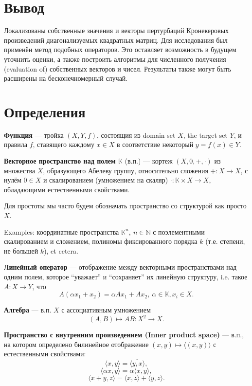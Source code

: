 \documentclass[14pt,a4paper]{extarticle}
\theoremstyle{definition}
\begin{document}
\section{Вывод}

Локализованы собственные значения и векторы пертурбаций Кронекеровых
произведений диагонализуемых квадратных матриц. Для исследования был применён
метод подобных операторов.
Это оставляет возможность в будущем уточнить оценки, а также построить алгоритмы
для численного получения (evaluation of) собственных векторов и чисел.
Результаты также могут быть расширены на бесконечномерный случай.

\newpage
\appendix
\section{Определения}

\textbf{Функция} --- тройка \( (X, Y, f) \), состоящия из domain set \( X \),
the target set \( Y \), и правила \( f \), ставящего каждому \( x\in X\)
в соответствие некоторый \( y=f(x)\in Y \).

\textbf{Векторное пространство над полем \(\mathbb{K}\)} (в.п.) --- кортеж \( (X, 0, +, \cdot) \)
из множества \( X \), образующего Абелеву группу, относительно сложения \(
+:X\to X\), с нулём \( 0\in X \)
и скалированием (умножением на скаляр)
\(\cdot: \mathbb{K}\times X \to X \), обладающими естественными свойствами.

Для простоты мы часто будем обозначать пространство со структурой как просто \( X \).

Examples: координатные пространства \( \mathbb{K}^n,\ n\in\mathbb{N} \) с поэлементными
скалированием и сложением, полиномы фиксированного порядка \( k \) (т.е.
степени, не большей \( k \)), et cetera.

\textbf{Линейный оператор} --- отображение между векторными пространствами над
одним полем,
которое ``уважает'' и ``сохраняет'' их линейную структуру, i.e. такое
\( A:X\to Y \), что
\[ A(\alpha x_1 + x_2) = \alpha Ax_1 + Ax_2,\
\alpha\in\mathbb{K}, x_i\in X. \]

\textbf{Алгебра} --- в.п. \( X \) с ассоциативным
умножением \[ (A, B)\mapsto AB: X^2\to X. \]

\textbf{Пространство с внутренним произведением (Inner product space)} --- в.п.,
на котором определено билинейное отображение \( (x,y) \mapsto \langle (x, y) \rangle\)
с естественными свойствами:
\[ \langle  x, y \rangle = \overline{\langle y, x \rangle}, \]
\[ \langle  \alpha x, y \rangle = \alpha \langle x, y \rangle, \]
\[ \langle  x + y, z \rangle =
  \langle x, z \rangle
  + \langle y, z \rangle.
\]
\end{document}
